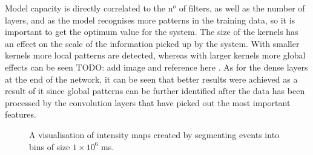 Model capacity is directly correlated to the n$ ^o $ of filters, as well as the number of layers, and as the model recognises more patterns in the training data, so it is important to get the optimum value for the system. The size of the kernels has an effect on the scale of the information picked up by the system. With smaller kernels more local patterns are detected, whereas with larger kernels more global effects can be seen \color{red} TODO: add image and reference here \color{black}. As for the dense layers at the end of the network, it can be seen that better results were achieved as a result of it since global patterns can be further identified after the data has been processed by the convolution layers that have picked out the most important features.

\begin{figure}[htb]%
    \centering
    \hfill
    \caption{A visualisation of intensity maps created by segmenting events into bins of size $ 1 \times 10^6 $ ms.}%
    \label{fig:tests}%
\end{figure}

